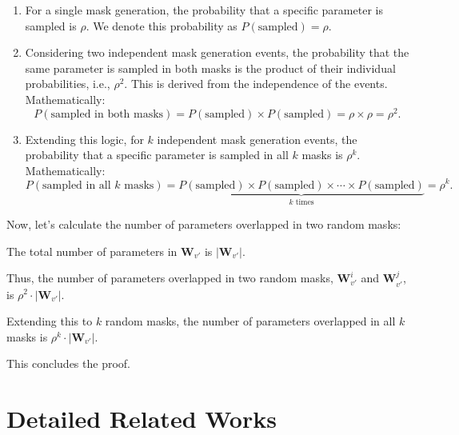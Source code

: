 \documentclass{article}
\begin{document}
\begin{enumerate}
    \item For a single mask generation, the probability that a specific parameter is sampled is $\rho$. We denote this probability as $P(\text{sampled}) = \rho$.
    \item Considering two independent mask generation events, the probability that the same parameter is sampled in both masks is the product of their individual probabilities, i.e., $\rho^2$. This is derived from the independence of the events. Mathematically:
    \[ P(\text{sampled in both masks}) = P(\text{sampled}) \times P(\text{sampled}) = \rho \times \rho = \rho^2. \]
    \item Extending this logic, for $k$ independent mask generation events, the probability that a specific parameter is sampled in all $k$ masks is $\rho^k$. Mathematically:
    \[ P(\text{sampled in all } k \text{ masks}) = \underbrace{P(\text{sampled}) \times P(\text{sampled}) \times \cdots \times P(\text{sampled})}_{k \text{ times}} = \rho^k. \]
\end{enumerate}

Now, let's calculate the number of parameters overlapped in two random masks:

The total number of parameters in $\mathbf{W}_{v'}$ is $|\mathbf{W}_{v'}|$.

Thus, the number of parameters overlapped in two random masks, $\mathbf{W}_{v'}^{i}$ and $\mathbf{W}_{v'}^{j}$, is $\rho^2\cdot|\mathbf{W}_{v'}|$.

Extending this to $k$ random masks, the number of parameters overlapped in all $k$ masks is $\rho^k\cdot|\mathbf{W}_{v'}|$.

This concludes the proof.

\qedsymbol



\section{Detailed Related Works}\label{app_sec:more_related_works}
\end{document}
